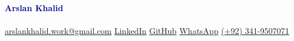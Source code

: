 \begin{center}
  {\Huge \textbf{\textcolor{darkblue}{Arslan Khalid}}} \\  %
  \vspace{4pt}
  {\Large \textit{\resumeRole}} \\  %
  \vspace{6pt}
  \href{mailto:arslankhalid.work@gmail.com}{arslankhalid.work@gmail.com} \quad \textbar{} \quad
  \href{https://www.linkedin.com/in/iarslankhalid/}{LinkedIn} \quad \textbar{} \quad
  \href{https://github.com/iarslankhalid}{GitHub} \quad \textbar{} \quad
  \href{https://wa.me/923419507071}{WhatsApp} \quad \textbar{} \quad
  \href{tel:+923419507071}{(+92) 341-9507071}
\end{center}
